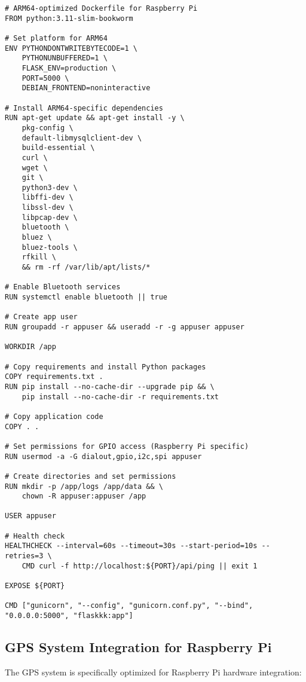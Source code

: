 \documentclass[12pt,a4paper]{report}
\begin{document}
\begin{lstlisting}[style=dockerstyle, caption=ARM64 Dockerfile for Raspberry Pi]
# ARM64-optimized Dockerfile for Raspberry Pi
FROM python:3.11-slim-bookworm

# Set platform for ARM64
ENV PYTHONDONTWRITEBYTECODE=1 \
    PYTHONUNBUFFERED=1 \
    FLASK_ENV=production \
    PORT=5000 \
    DEBIAN_FRONTEND=noninteractive

# Install ARM64-specific dependencies
RUN apt-get update && apt-get install -y \
    pkg-config \
    default-libmysqlclient-dev \
    build-essential \
    curl \
    wget \
    git \
    python3-dev \
    libffi-dev \
    libssl-dev \
    libpcap-dev \
    bluetooth \
    bluez \
    bluez-tools \
    rfkill \
    && rm -rf /var/lib/apt/lists/*

# Enable Bluetooth services
RUN systemctl enable bluetooth || true

# Create app user
RUN groupadd -r appuser && useradd -r -g appuser appuser

WORKDIR /app

# Copy requirements and install Python packages
COPY requirements.txt .
RUN pip install --no-cache-dir --upgrade pip && \
    pip install --no-cache-dir -r requirements.txt

# Copy application code
COPY . .

# Set permissions for GPIO access (Raspberry Pi specific)
RUN usermod -a -G dialout,gpio,i2c,spi appuser

# Create directories and set permissions
RUN mkdir -p /app/logs /app/data && \
    chown -R appuser:appuser /app

USER appuser

# Health check
HEALTHCHECK --interval=60s --timeout=30s --start-period=10s --retries=3 \
    CMD curl -f http://localhost:${PORT}/api/ping || exit 1

EXPOSE ${PORT}

CMD ["gunicorn", "--config", "gunicorn.conf.py", "--bind", "0.0.0.0:5000", "flaskkk:app"]
\end{lstlisting}

\subsection{GPS System Integration for Raspberry Pi}

The GPS system is specifically optimized for Raspberry Pi hardware integration:
\end{document}
